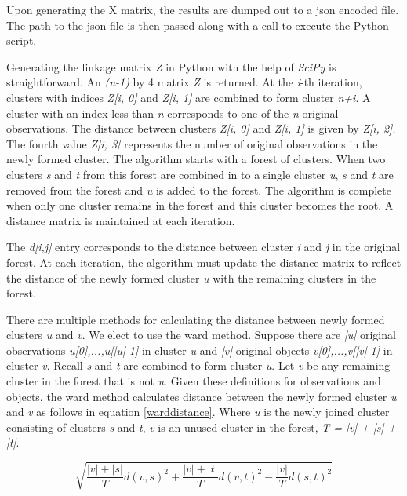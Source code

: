 \documentclass[msc,oneside]{ubcthesis}%
\begin{document}
Upon generating the X matrix, the results are dumped out to a json encoded file. The path to the json file is then passed along with a call to execute the Python script.

Generating the linkage matrix \textit{Z} in Python with the help of \textit{SciPy} is straightforward. An \textit{(n-1)} by 4 matrix \textit{Z} is returned. At the \textit{i}-th iteration, clusters with indices \textit{Z[i, 0]} and \textit{Z[i, 1]} are combined to form cluster \textit{n+i}. A cluster with an index less than \textit{n} corresponds to one of the \textit{n} original observations. The distance between clusters \textit{Z[i, 0]} and \textit{Z[i, 1]} is given by \textit{Z[i, 2]}. The fourth value \textit{Z[i, 3]} represents the number of original observations in the newly formed cluster. The algorithm starts with a forest of clusters. When two clusters \textit{s} and \textit{t} from this forest are combined in to a single cluster \textit{u}, \textit{s} and \textit{t} are removed from the forest and \textit{u} is added to the forest. The algorithm is complete when only one cluster remains in the forest and this cluster becomes the root. A distance matrix is maintained at each iteration. 

The \textit{d[i,j]} entry corresponds to the distance between cluster \textit{i} and \textit{j} in the original forest. At each iteration, the algorithm must update the distance matrix to reflect the distance of the newly formed cluster \textit{u} with the remaining clusters in the forest.

There are multiple methods for calculating the distance between newly formed clusters \textit{u} and \textit{v}. We elect to use the ward method. Suppose there are \textit{|u|} original observations \textit{u[0],...,u[|u|-1]} in cluster \textit{u} and \textit{|v|} original objects \textit{v[0],...,v[|v|-1]} in cluster \textit{v}. Recall \textit{s} and \textit{t} are combined to form cluster \textit{u}. Let \textit{v} be any remaining cluster in the forest that is not \textit{u}. Given these definitions for observations and objects, the ward method calculates distance between the newly formed cluster \textit{u} and \textit{v} as follows in equation \ref{warddistance}. Where \textit{u} is the newly joined cluster consisting of clusters \textit{s} and \textit{t}, \textit{v} is an unused cluster in the forest, \textit{T = |v| + |s| + |t|}.

\begin{equation}
\label{warddistance}
\sqrt{\frac{|v| + |s|}{T}d(v,s)^2 + \frac{|v| + |t|}{T}d(v,t)^2 - \frac{|v|}{T}d(s,t)^2}
\end{equation}
\end{document}
